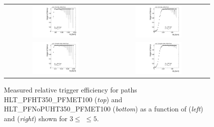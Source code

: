 \begin{figure}[!t]
  \centering
  \begin{tabular}{cc}
                \includegraphics[width=0.47\textwidth]{figures/turn_on_HT_TagEle27WP80_ProbePFHT350PFMET100_MHT200_chs_NJets3-5.pdf} &
                \includegraphics[width=0.47\textwidth]{figures/turn_on_MHT_TagEle27WP80_ProbePFHT350PFMET100_HT500_chs_NJets3-5.pdf} \\
                \includegraphics[width=0.47\textwidth]{figures/turn_on_HT_TagEle27WP80_ProbePFNoPUHT350PFMET100_MHT200_chs_NJets3-5.pdf} &
                \includegraphics[width=0.47\textwidth]{figures/turn_on_MHT_TagEle27WP80_ProbePFNoPUHT350PFMET100_HT500_chs_NJets3-5.pdf} \\
  \end{tabular}
\caption{Measured relative trigger efficiency for paths HLT\_PFHT350\_PFMET100 (\textit{top}) and HLT\_PFNoPUHT350\_PFMET100 (\textit{bottom}) as a function of \HT (\textit{left}) and \MHT (\textit{right}) shown for $3 \leq$ \NJets $\leq 5$.} 
  \label{fig:trig_eff_3njets5}
\end{figure}
